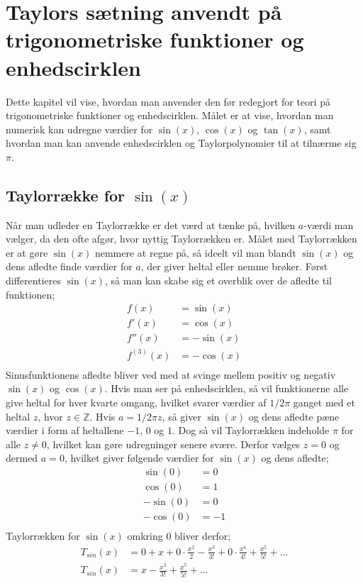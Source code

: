 \chapter{Taylors sætning anvendt på trigonometriske funktioner og enhedscirklen}
Dette kapitel vil vise, hvordan man anvender den før redegjort for teori på trigonometriske funktioner og enhedscirklen. Målet er at vise, hvordan man numerisk kan udregne værdier for $\sin(x)$, $\cos(x)$ og $\tan(x)$, samt hvordan man kan anvende enhedscirklen og Taylorpolynomier til at tilnærme sig $\pi$.
\section{Taylorrække for $\sin(x)$}
Når man udleder en Taylorrække er det værd at tænke på, hvilken $a$-værdi man vælger, da den ofte afgør, hvor nyttig Taylorrækken er. Målet med Taylorrækken er at gøre $\sin(x)$ nemmere at regne på, så ideelt vil man blandt $\sin(x)$ og dens afledte finde værdier for $a$, der giver heltal eller nemme brøker. Først differentieres $\sin(x)$, så man kan skabe sig et overblik over de afledte til funktionen;
\begin{align*}
f(x) &= \sin(x) \\
f'(x) &= \cos(x) \\
f''(x) &= -\sin(x) \\
f^{(3)}(x) &= -\cos(x) \\
\end{align*}
Sinusfunktionens afledte bliver ved med at svinge mellem positiv og negativ $\sin(x)$ og $\cos(x)$. Hvis man ser på enhedscirklen, så vil funktionerne alle give heltal for hver kvarte omgang, hvilket svarer værdier af $1/2\pi$ ganget med et heltal $z$, hvor $z\in\mathbb{Z}$. Hvis $a=1/2\pi z$, så giver $\sin(x)$ og dens afledte pæne værdier i form af heltallene $-1$, $0$ og $1$. Dog så vil Taylorrækken indeholde $\pi$ for alle $z \neq 0$, hvilket kan gøre udregninger senere svære. Derfor vælges $z=0$ og dermed $a=0$, hvilket giver følgende værdier for $\sin(x)$ og dens afledte;
\begin{align*}
\sin(0) &= 0 \\
\cos(0) &= 1 \\
-\sin(0) &= 0 \\
-\cos(0) &= -1 \\
\end{align*}
Taylorrækken for $\sin(x)$ omkring $0$ bliver derfor;
\begin{align*}
T_{sin} (x) &= 0+x+0 \cdot \frac{x^2}{2}-\frac{x^3}{3!}+0 \cdot \frac{x^4}{4!}+\frac{x^5}{5!}+... 
\\
T_{sin} (x) &= x-\frac{x^3}{3!}+\frac{x^5}{5!}+... \\
\end{align*}
